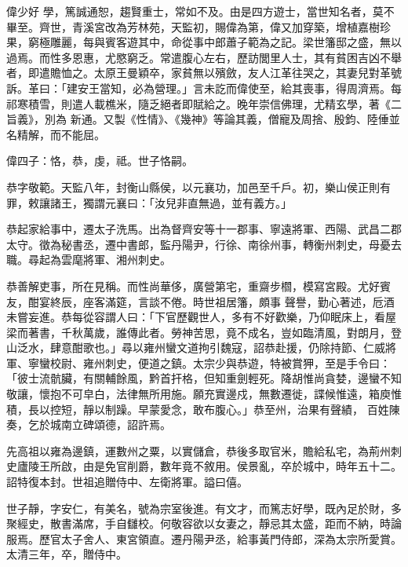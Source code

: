 \begin{pinyinscope}
 偉少好
 學，篤誠通恕，趨賢重士，常如不及。由是四方遊士，當世知名者，莫不畢至。齊世，青溪宮改為芳林苑，天監初，賜偉為第，偉又加穿築，增植嘉樹珍果，窮極雕麗，每與賓客遊其中，命從事中郎蕭子範為之記。梁世籓邸之盛，無以過焉。而性多恩惠，尤愍窮乏。常遣腹心左右，歷訪閭里人士，其有貧困吉凶不舉者，即遣贍恤之。太原王曼穎卒，家貧無以殯斂，友人江革往哭之，其妻兒對革號訴。革曰：「建安王當知，必為營理。」言未訖而偉使至，給其喪事，得周濟焉。每祁寒積雪，則遣人載樵米，隨乏絕者即賦給之。晚年崇信佛理，尤精玄學，著《二旨義》，別為
 新通。又製《性情》、《幾神》等論其義，僧寵及周捨、殷鈞、陸倕並名精解，而不能屈。



 偉四子：恪，恭，虔，祗。世子恪嗣。



 恭字敬範。天監八年，封衡山縣侯，以元襄功，加邑至千戶。初，樂山侯正則有罪，敕讓諸王，獨謂元襄曰：「汝兒非直無過，並有義方。」



 恭起家給事中，遷太子洗馬。出為督齊安等十一郡事、寧遠將軍、西陽、武昌二郡太守。徵為秘書丞，遷中書郎，監丹陽尹，行徐、南徐州事，轉衡州刺史，母憂去職。尋起為雲麾將軍、湘州刺史。



 恭善解吏事，所在見稱。而性尚華侈，廣營第宅，重齋步櫩，模寫宮殿。尤好賓友，酣宴終辰，座客滿筵，言談不倦。時世祖居籓，頗事
 聲譽，勤心著述，卮酒未嘗妄進。恭每從容謂人曰：「下官歷觀世人，多有不好歡樂，乃仰眠床上，看屋梁而著書，千秋萬歲，誰傳此者。勞神苦思，竟不成名，豈如臨清風，對朗月，登山泛水，肆意酣歌也。」尋以雍州蠻文道拘引魏寇，詔恭赴援，仍除持節、仁威將軍、寧蠻校尉、雍州刺史，便道之鎮。太宗少與恭遊，特被賞狎，至是手令曰：「彼士流骯臟，有關輔餘風，黔首扞格，但知重劍輕死。降胡惟尚貪婪，邊蠻不知敬讓，懷抱不可皁白，法律無所用施。願充實邊戍，無數遷徙，諜候惟遠，箱庾惟積，長以控短，靜以制躁。早蒙愛念，敢布腹心。」恭至州，治果有聲績，
 百姓陳奏，乞於城南立碑頌德，詔許焉。



 先高祖以雍為邊鎮，運數州之粟，以實儲倉，恭後多取官米，贍給私宅，為荊州刺史廬陵王所啟，由是免官削爵，數年竟不敘用。侯景亂，卒於城中，時年五十二。詔特復本封。世祖追贈侍中、左衛將軍。謚曰僖。



 世子靜，字安仁，有美名，號為宗室後進。有文才，而篤志好學，既內足於財，多聚經史，散書滿席，手自讎校。何敬容欲以女妻之，靜忌其太盛，距而不納，時論服焉。歷官太子舍人、東宮領直。遷丹陽尹丞，給事黃門侍郎，深為太宗所愛賞。太清三年，卒，贈侍中。




\end{pinyinscope}
